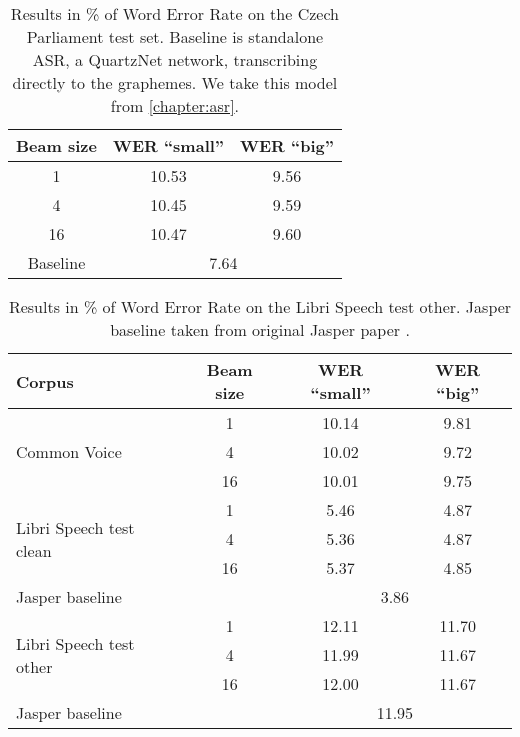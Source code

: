 \begin{table}[h]
	\centering
	\begin{tabular}{c|cc}
		\bf Beam size & \bf WER ``small''& \bf WER ``big'' \\
		\hline
		1    &    10.53 & 9.56    \\
		4    &    10.45& 9.59    \\
		16    &    10.47& 9.60\\
		Baseline & \multicolumn{2}{c}{7.64} 
		
	\end{tabular}
	
	\caption{Results in \% of Word Error Rate on the Czech Parliament test set. Baseline is standalone ASR, a QuartzNet network, transcribing directly to the graphemes. We take this model from \cref{chapter:asr}.}
	\label{tab:phon_cs}
\end{table}


\begin{table}[H]
	\centering
	\begin{tabular}{lc|cc}
		\bf Corpus & \bf Beam size & \bf WER ``small''& \bf WER ``big'' \\
		\hline
		\multirow{3}{*}{Common Voice}    & 1    &10.14    &    9.81    \\
		& 4    & 10.02    &    9.72    \\
		& 16    &10.01    & 9.75    \\
		\hline
		
		\multirow{3}{*}{Libri Speech test clean}    & 1    &    5.46 &    4.87    \\
		& 4    &  5.36 &    4.87    \\
		& 16     &5.37    & 4.85    \\
		\multicolumn{2}{l|}{Jasper baseline} & \multicolumn{2}{c}{3.86} \\
		\hline
		
		\multirow{3}{*}{Libri Speech test other}    & 1    &    12.11 &11.70    \\
		& 4    &11.99     &    11.67    \\
		& 16    & 12.00     & 11.67    \\
		\multicolumn{2}{l|}{Jasper baseline} & \multicolumn{2}{c}{11.95} \\
		
	\end{tabular}
	
	\caption{Results in \% of Word Error Rate on the Libri Speech test other. Jasper baseline taken from original Jasper paper .}
	\label{tab:phon_en}
\end{table}


